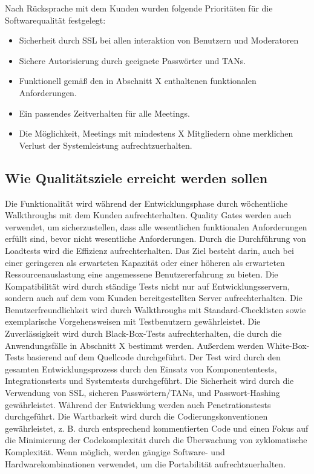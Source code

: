     Nach Rücksprache mit dem Kunden wurden folgende Prioritäten für die Softwarequalität festgelegt:

		\begin{itemize}
			\item Sicherheit durch SSL bei allen interaktion von Benutzern und Moderatoren
            \item Sichere Autorisierung durch geeignete Passwörter und TANs.
            \item Funktionell gemäß den in Abschnitt X enthaltenen funktionalen Anforderungen.
            \item Ein passendes Zeitverhalten für alle Meetings.
            \item Die Möglichkeit, Meetings mit mindestens X Mitgliedern ohne merklichen Verlust der Systemleistung aufrechtzuerhalten.

		\end{itemize}

	\subsection{Wie Qualitätsziele erreicht werden sollen}
	
	Die Funktionalität wird während der Entwicklungsphase durch wöchentliche Walkthroughs mit dem Kunden aufrechterhalten. Quality Gates werden auch verwendet, um sicherzustellen, dass alle wesentlichen funktionalen Anforderungen erfüllt sind, bevor nicht wesentliche Anforderungen.
	\linebreak
	Durch die Durchführung von Loadtests wird die Effizienz aufrechterhalten. Das Ziel besteht darin, auch bei einer geringeren als erwarteten Kapazität oder einer höheren als erwarteten Ressourcenauslastung eine angemessene Benutzererfahrung zu bieten.
	\linebreak
	Die Kompatibilität wird durch ständige Tests nicht nur auf Entwicklungsservern, sondern auch auf dem vom Kunden bereitgestellten Server aufrechterhalten.
	\linebreak
	Die Benutzerfreundlichkeit wird durch Walkthroughs mit Standard-Checklisten sowie exemplarische Vorgehensweisen mit Testbenutzern gewährleistet.
	\linebreak
	Die Zuverlässigkeit wird durch Black-Box-Tests aufrechterhalten, die durch die Anwendungsfälle in Abschnitt X bestimmt werden. Außerdem werden White-Box-Tests basierend auf dem Quellcode durchgeführt. Der Test wird durch den gesamten Entwicklungsprozess durch den Einsatz von Komponententests, Integrationstests und Systemtests durchgeführt.
	\linebreak
	Die Sicherheit wird durch die Verwendung von SSL, sicheren Passwörtern/TANs, und Passwort-Hashing gewährleistet. Während der Entwicklung werden auch Penetrationstests durchgeführt.
	\linebreak
	Die Wartbarkeit wird durch die Codierungskonventionen gewährleistet, z. B. durch entsprechend kommentierten Code und einen Fokus auf die Minimierung der Codekomplexität durch die Überwachung von zyklomatische Komplexität.
	\linebreak
	Wenn möglich, werden gängige Software- und Hardwarekombinationen verwendet, um die Portabilität aufrechtzuerhalten.
